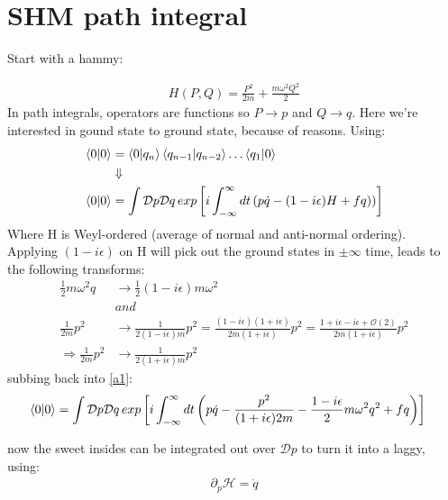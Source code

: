 \documentclass{article}
\begin{document}
\section*{SHM path integral}%
\label{sec:shm_path_integral}

Start with a hammy:

\begin{align}
	H \left(P,Q\right) = \frac{P^2}{2m} + \frac{m\omega^2Q^2}{2}
\end{align}
In path integrals, operators are functions so $P \rightarrow p$ and $Q \rightarrow q$. Here we're interested in gound state to ground state, because of reasons. Using:
\begin{align}
	\braket{0}{0} &= \braket{0}{q_n}\braket{q_{n-1}}{q_{n-2}}\ldots \braket{q_1}{0} \\
		      &\Downarrow \nonumber \\
	\braket{0}{0} &= \int \mathcal{D}p \mathcal{D}q \,exp \left[i \int_{-\infty}^{\infty}dt \left(p\dot{q} - \left(1-i\epsilon)H + fq \right)\right)\right] \label{a1}
\end{align}
Where H is Weyl-ordered (average of normal and anti-normal ordering).\\
Applying $(1-i\epsilon)$ on H will pick out the ground states in $\pm\infty$ time, leads to the following transforms:
\begin{align}
	\frac{1}{2}m\omega^2q &\rightarrow \frac{1}{2}(1-i\epsilon)m\omega^2 \\
		  & and \\
	\frac{1}{2m}p^2 &\rightarrow \frac{1}{2(1-i\epsilon)m}p^2 = \frac{(1-i\epsilon)(1+i\epsilon)}{2m(1+i\epsilon)}p^2 = \frac{1+i\epsilon-i\epsilon+\mathcal{O}(2)}{2m(1+i\epsilon)}p^2 \\
\Rightarrow \frac{1}{2m}p^2 &\rightarrow \frac{1}{2(1+i\epsilon)m}p^2
\end{align}
subbing back into \ref{a1}:
\begin{align}
	\braket{0}{0} &= \int \mathcal{D}p \mathcal{D}q \,exp \left[i \int_{-\infty}^{\infty}dt \left(p\dot{q} - \frac{p^2}{(1+i\epsilon)2m} - \frac{1-i\epsilon}{2} m\omega^2q^2 + fq \right)\right]
\end{align}

now the sweet insides can be integrated out over $\mathcal{D}p$ to turn it into a laggy, using:
\begin{align}
	\partial_{p}\mathcal{H} = \dot{q}
\end{align}
\end{document}
